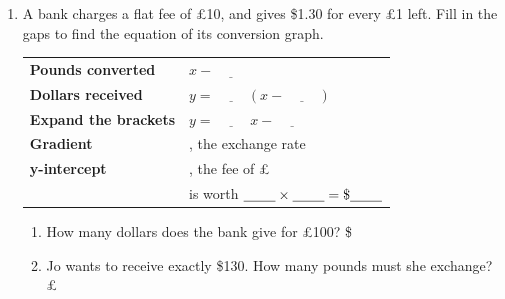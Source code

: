 \documentclass[12pt,a4paper]{article}
\newcommand{\ansline}[1][2.2cm]{\underline{\hspace{#1}}}
\begin{document}
\begin{enumerate}[resume]

\item A bank charges a flat fee of \pounds10, and gives \$1.30 for every
\pounds1 left. Fill in the gaps to find the equation of its conversion graph.
\vspace{2pt}

\begin{minipage}[t]{0.40\linewidth}
\centering
{}
\end{minipage}%
\begin{minipage}[t]{0.60\linewidth}
\vspace{0pt}
\begin{tabular}{@{}l@{\hspace{0.8em}}l@{}}
\textbf{Pounds converted} & $x-\ansline[1cm]$\\[4pt]
\textbf{Dollars received} & $y=\ansline[1cm](x-\ansline[1cm])$\\[4pt]
\textbf{Expand the brackets} & $y=\ansline[1cm]\,x-\ansline[1cm]$\\[4pt]
\textbf{Gradient} & \ansline[1cm], the exchange rate\\[4pt]
\textbf{y-intercept} & \ansline[1cm], the fee of \pounds\ansline[0.8cm]\\[4pt]
 & is worth $\ansline[0.8cm]\times\ansline[0.8cm]=\$\ansline[0.8cm]$
\end{tabular}
\end{minipage}

\begin{enumerate}
  \item How many dollars does the bank give for \pounds100?
        \hfill \$\ansline[2.5cm]

        \vspace{3em}
  \item Jo wants to receive exactly \$130. How many pounds must she exchange?
        \hfill \pounds\ansline[2.5cm]


\end{enumerate}
\end{enumerate}
\end{document}
